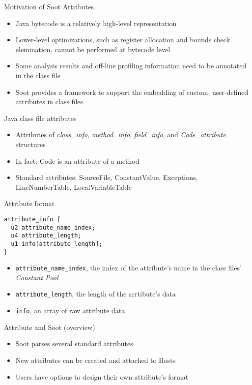 \begin{slide}{Motivation of Soot Attributes}
\begin{itemize}
\item Java bytecode is a relatively high-level representation
\item Lower-level optimizations, such as register allocation and bounds 
      check elemination, cannot be performed at bytecode level 
\item Some analysis results and off-line profiling information need to
      be annotated in the class file
\item Soot provides a framework to support the embedding of custom, 
      user-defined attributes in class files
\end{itemize}
\end{slide}

\begin{slide}{Java class file attributes}
\begin{itemize}
\item Attributes of {\em class\_info}, {\em method\_info}, 
      {\em field\_info}, and {\em Code\_attribute} structures
\item In fact: Code is an attribute of a method
\item Standard attributes: SourceFile, ConstantValue, Exceptions,
      LineNumberTable, LocalVariableTable
\end{itemize}
\end{slide}

\begin{slide}{Attribute format}
\small{
\begin{verbatim}
attribute_info {
  u2 attribute_name_index;
  u4 attribute_length;
  u1 info[attribute_length];
}
\end{verbatim}
}
\begin{itemize}
\item {\tt attribute\_name\_index}, the index of the attribute's name in the class files' {\em Constant Pool}
\item {\tt attribute\_length}, the length of the arrtibute's data
\item {\tt info}, an array of raw attribute data
\end{itemize}
\end{slide}

\begin{slide}{Attribute and Soot (overview)}
\begin{itemize}
\item Soot parses several standard attributes 
\item New attributes can be created and attached to Hosts
\item Users have options to design their own attribute's format
\end{itemize}
\end{slide}

